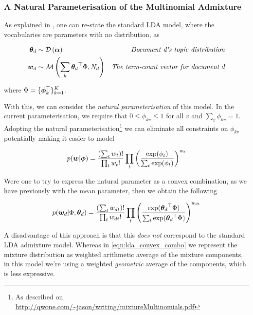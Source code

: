 \subsubsection*{A Natural Parameterisation of the Multinomial Admixture}
As explained in \cite{Buntine2002}, one can re-state the standard LDA model, where the vocabularies are parameters with no distribution, as

\begin{align}
{  \bm \theta _d } & \sim \mathcal{D} \left( {\bm \alpha} \right) & \text{\emph{Document d's topic distribution}} \\
\bm w_d & \sim \mathcal{M} \left( {\sum_k { \bm \theta_d }^\top\Phi},{N_d} \right) & \text{\emph{The term-count vector for document $d$}} \label{eqn:lda_convex_combo}
\end{align}

where $\Phi = \{\bm \phi_k^\top\}_{k=1}^{K}$.

With this, we can consider the \emph{natural parameterisation} of this model. In the current parameterisation, we require that $0 \leq \phi_{kv} \leq 1$ for all $v$ and $\sum_v \phi_{kv} = 1$. Adopting the natural parameterisation\footnote{As described on \url{http://qwone.com/~jason/writing/mixtureMultinomials.pdf}} we can eliminate all constraints on $\phi_{kv}$ potentially making it easier to model

\begin{align}
p(\bm w|\bm \phi) = \frac{(\sum_t w_t)!}{\prod_t w_t !} 
\prod_t \left(   
    \frac{\exp(\phi_t)}{\sum_t \exp(\phi_t)}
\right)^{w_t}
\end{align}

Were one to try to express the natural parameter as a convex combination, as we have previously with the mean parameter, then we obtain the following

\begin{align}
p({ \bm w_d }|\Phi, { \bm \theta_d }) = \frac{(\sum_t w_{dt})!}{\prod_t w_{dt} !} 
\prod_t \left(   
    \frac{\exp({ \bm \theta_d }^\top\Phi)}{\sum_t \exp({ \bm \theta_d }^\top\Phi)}
\right)^{w_{dt}}
\end{align}

A disadvantage of this approach is that this \emph{does not} correspond to the standard LDA admixture model. Whereas in \eqref{eqn:lda_convex_combo} we represent the mixture distribution as weighted arithmetic average of the mixture components, in this model we're using a weighted \emph{geometric} average of the components, which is less expressive.


